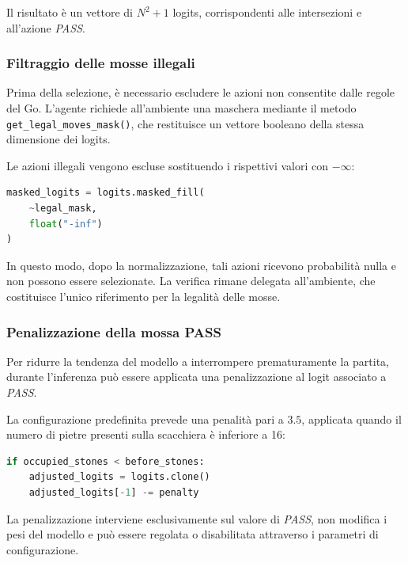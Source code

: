 Il risultato è un vettore di \(N^2+1\) logits, corrispondenti alle intersezioni e all'azione \textit{PASS}.

\subsubsection{Filtraggio delle mosse illegali}

Prima della selezione, è necessario escludere le azioni non consentite dalle regole del Go. L'agente richiede all'ambiente una maschera mediante il metodo \texttt{get\_legal\_moves\_mask()}, che restituisce un vettore booleano della stessa dimensione dei logits.

Le azioni illegali vengono escluse sostituendo i rispettivi valori con \(-\infty\):

\begin{lstlisting}[language=Python, caption={Mascheramento delle mosse illegali}, label={lst:legal_mask}]
masked_logits = logits.masked_fill(
    ~legal_mask,
    float("-inf")
)
\end{lstlisting}

In questo modo, dopo la normalizzazione, tali azioni ricevono probabilità nulla e non possono essere selezionate. La verifica rimane delegata all'ambiente, che costituisce l'unico riferimento per la legalità delle mosse.

\subsubsection{Penalizzazione della mossa PASS}

Per ridurre la tendenza del modello a interrompere prematuramente la partita, durante l'inferenza può essere applicata una penalizzazione al logit associato a \textit{PASS}.

La configurazione predefinita prevede una penalità pari a \(3.5\), applicata quando il numero di pietre presenti sulla scacchiera è inferiore a 16:

\begin{lstlisting}[language=Python, caption={Penalizzazione del logit PASS}, label={lst:pass_penalty}]
if occupied_stones < before_stones:
    adjusted_logits = logits.clone()
    adjusted_logits[-1] -= penalty
\end{lstlisting}

La penalizzazione interviene esclusivamente sul valore di \textit{PASS}, non modifica i pesi del modello e può essere regolata o disabilitata attraverso i parametri di configurazione.

